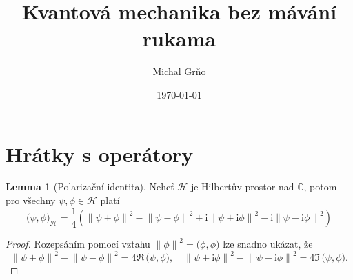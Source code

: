 \documentclass[10pt,a4paper]{article}
\theoremstyle{definition}
\newtheorem{lemma}[theorem]{Lemma}
\newcommand{\const}[1]{\mathrm{#1}}
\newcommand{\norm}[1]{\left\lVert#1\right\rVert}
\newcommand{\innerprod}[2]{\big( #1, #2 \big)}
\renewcommand{\i}{\const{i}}
\def\C{\mathbb{C}}
\def\H{\mathcal{H}}
\begin{document}
\title{Kvantová mechanika bez mávání rukama}
\author{Michal Grňo}
\date{\today}

\maketitle

\section{Hrátky s operátory}
\begin{lemma}[Polarizační identita]
    \label{polarizacni-identita}
    Nehcť $\H$ je Hilbertův prostor nad $\C$, potom pro všechny $\psi, \phi \in \H$ platí
    \begin{equation*}
        \innerprod{\psi}{\phi}_\H
        =
        \frac{1}{4}
        \left(
            \norm{\psi + \phi}^2
            - \norm{\psi - \phi}^2
            + \i \norm{\psi + \i \phi}^2
            - \i \norm{\psi - \i \phi}^2
        \right)
    \end{equation*}
\end{lemma}
\begin{proof}
    Rozepsáním pomocí vztahu $\norm{\phi}^2 = \innerprod{\phi}{\phi}$ lze snadno ukázat, že
    \begin{equation*}
        \norm{\psi + \phi}^2 - \norm{\psi - \phi}^2
        = 4 \Re \, \innerprod{\psi}{\phi},
        \quad
        \norm{\psi + \i\phi}^2 - \norm{\psi - \i\phi}^2
        = 4 \Im \, \innerprod{\psi}{\phi}.
    \end{equation*}
\end{proof}
\end{document}
